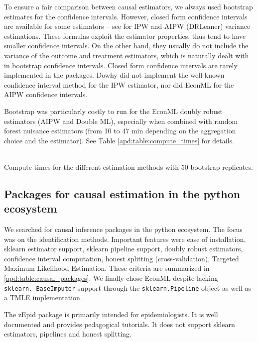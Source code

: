 \documentclass[french,12pt,twoside,a4paper]{book}
\begin{document}
\begin{appendices}
  To ensure a fair comparison between causal estimators, we always used
  bootstrap estimates for the confidence intervals. However, closed form
  confidence intervals are available for some estimators -- see \cite{wager2020stats}
  for IPW and AIPW (DRLeaner) variance estimations. These formulas exploit the
  estimator properties, thus tend to have smaller confidence intervals. On the
  other hand, they usually do not include the variance of the outcome and
  treatment estimators, which is naturally dealt with in bootstrap confidence
  intervals. Closed form confidence intervals are rarely implemented in the
  packages. Dowhy did not implement the well-known confidence interval method for
  the IPW estimator, nor did EconML for the AIPW confidence intervals.

  Bootstrap was particularly costly to run for the EconML doubly robust
  estimators (AIPW and Double ML), especially when combined with random forest nuisance
  estimators (from 10 to 47 min depending on the aggregation choice and the
  estimator). See Table \ref{apd:table:compute_times} for details.

  \begin{table}[]
    \centering\small
    
    \\
    \caption{Compute times for the different estimation methods with 50 bootstrap replicates.}\label{apd:table:compute_times}
  \end{table}

  \subsection{Packages for causal estimation in the python
    ecosystem}\label{apd:packages}

  We searched for causal inference packages in the python ecosystem. The focus
  was on the identification methods. Important features were ease of
  installation, sklearn estimator support, sklearn pipeline support, doubly
  robust estimators, confidence interval computation, honest splitting
  (cross-validation), Targeted Maximum Likelihood Estimation. These criteria are
  summarized in \ref{apd:table:causal_packages}. We finally chose EconML despite
  lacking \texttt{sklearn.\_BaseImputer} support through the
  \texttt{sklearn.Pipeline} object as well as a TMLE implementation.

  The zEpid package is primarily intended for epidemiologists. It is well documented
  and provides pedagogical tutorials. It does not support sklearn estimators,
  pipelines and honest splitting.


\end{appendices}
\end{document}
